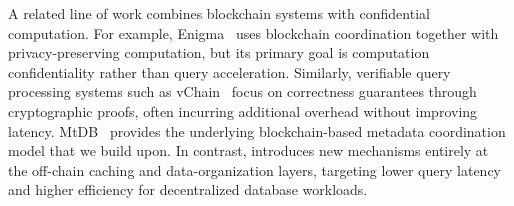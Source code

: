 A related line of work combines blockchain systems with confidential computation. For example, Enigma~\cite{zyskind2018enigma} uses blockchain coordination together with privacy-preserving computation, but its primary goal is computation confidentiality rather than query acceleration. Similarly, verifiable query processing systems such as vChain~\cite{xu2019vchain} focus on correctness guarantees through cryptographic proofs, often incurring additional overhead without improving latency. MtDB~\cite{hossain2025mtdb} provides the underlying blockchain-based metadata coordination model that we build upon. In contrast, \ours{} introduces new mechanisms entirely at the off-chain caching and data-organization layers, targeting lower query latency and higher efficiency for decentralized database workloads.
















